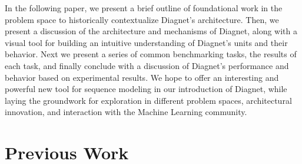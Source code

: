 \documentclass{article}
\begin{document}
In the following paper, we present a brief outline of foundational work in the problem space to historically contextualize Diagnet’s architecture.  Then, we present a discussion of the architecture and mechanisms of Diagnet, along with a visual tool for building an intuitive understanding of Diagnet’s units and their behavior.  Next we present a series of common benchmarking tasks, the results of each task, and finally conclude with a discussion of Diagnet’s performance and behavior based on experimental results.  We hope to offer an interesting and powerful new tool for sequence modeling in our introduction of Diagnet, while laying the groundwork for exploration in different problem spaces, architectural innovation, and interaction with the Machine Learning community.

%
%
%

\section{Previous Work}
\label{gen_inst}



\end{document}
